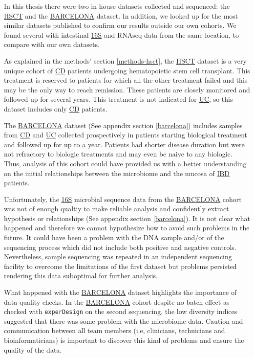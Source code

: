 \documentclass[
  12pt,
  a4paper,
  twoside,
  openright]{book}
\begin{document}
In this thesis there were two in house datasets collected and sequenced: the \protect\hyperlink{acronyms_HSCT}{HSCT} and the \protect\hyperlink{acronyms_BARCELONA}{BARCELONA} dataset.
In addition, we looked up for the most similar datasets published to confirm our results outside our own cohorts.
We found several with intestinal \protect\hyperlink{acronyms_16S}{16S} and RNAseq data from the same location, to compare with our own datasets.

As explained in the methods' section \ref{methods-hsct}, the \protect\hyperlink{acronyms_HSCT}{HSCT} dataset is a very unique cohort of \protect\hyperlink{acronyms_CD}{CD} patients undergoing hematopoietic stem cell transplant.
This treatment is reserved to patients for which all the other treatment failed and this may be the only way to reach remission.
These patients are closely monitored and followed up for several years.
This treatment is not indicated for \protect\hyperlink{acronyms_UC}{UC}, so this dataset includes only \protect\hyperlink{acronyms_CD}{CD} patients.

The \protect\hyperlink{acronyms_BARCELONA}{BARCELONA} dataset (See appendix section \ref{barcelona}) includes samples from \protect\hyperlink{acronyms_CD}{CD} and \protect\hyperlink{acronyms_UC}{UC} collected prospectively in patients starting biological treatment and followed up for up to a year.
Patients had shorter disease duration but were not refractory to biologic treatments and may even be naive to any biologic.
Thus, analysis of this cohort could have provided us with a better understanding on the initial relationships between the microbiome and the mucosa of \protect\hyperlink{acronyms_IBD}{IBD} patients.

Unfortunately, the \protect\hyperlink{acronyms_16S}{16S} microbial sequence data from the \protect\hyperlink{acronyms_BARCELONA}{BARCELONA} cohort was not of enough qualtiy to make reliable analysis and confidently extract hypothesis or relationships (See appendix section \ref{barcelona}).
It is not clear what happened and therefore we cannot hypothesize how to avoid such problems in the future.
It could have been a problem with the DNA sample and/or of the sequencing process which did not include both positive and negative controls.
Nevertheless, sample sequencing was repeated in an independent sequencing facility to overcome the limitations of the first dataset but problems persisted rendering this data suboptimal for further analysis.

What happened with the \protect\hyperlink{acronyms_BARCELONA}{BARCELONA} dataset highlights the importance of data quality checks.
In the \protect\hyperlink{acronyms_BARCELONA}{BARCELONA} cohort despite no batch effect as checked with \texttt{experDesign} on the second sequencing, the low diversity indices suggested that there was some problem with the microbiome data.
Caution and communication between all team members (i.e, clinicians, technicians and bioinformaticians) is important to discover this kind of problems and ensure the quality of the data.
\end{document}

